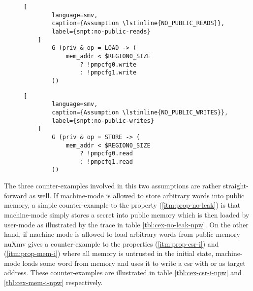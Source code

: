 \begin{figure}
    \begin{lstlisting}[
        language=smv,
        caption={Assumption \lstinline{NO_PUBLIC_READS}},
        label={snpt:no-public-reads}
    ]
        G (priv & op = LOAD -> (
            mem_addr < $REGION0_SIZE
                ? !pmpcfg0.write
                : !pmpcfg1.write
        ))
    \end{lstlisting}

    \begin{lstlisting}[
        language=smv,
        caption={Assumption \lstinline{NO_PUBLIC_WRITES}},
        label={snpt:no-public-writes}
    ]
        G (priv & op = STORE -> (
            mem_addr < $REGION0_SIZE
                ? !pmpcfg0.read
                : !pmpcfg1.read
        ))
    \end{lstlisting}
\end{figure}

The three counter-examples involved in this two assumptions are rather straight-forward as well.
If machine-mode is allowed to store arbitrary words into public memory, a simple counter-example to the  property (\ref{itm:prop-no-leak}) is that machine-mode simply stores a secret into public memory which is then loaded by user-mode as illustrated by the trace in table \ref{tbl:cex-no-leak-npw}.
On the other hand, if machine-mode is allowed to load arbitrary words from public memory nuXmv gives a counter-example to the properties  (\ref{itm:prop-csr-i}) and  (\ref{itm:prop-mem-i}) where all memory is untrusted in the initial state, machine-mode loads some word from memory and uses it to write a \gls{csr} with or as target address.
These counter-examples are illustrated in table \ref{tbl:cex-csr-i-npw} and \ref{tbl:cex-mem-i-npw} respectively.

\begin{table}
    \begin{subtable}{\textwidth}
        \centering
        
        \caption{ (\ref{itm:prop-no-leak})}
        \label{tbl:cex-no-leak-npw}
    \end{subtable}

    \begin{subtable}{\textwidth}
        \centering
        
        \caption{ (\ref{itm:prop-csr-i})}
        \label{tbl:cex-csr-i-npw}
    \end{subtable}

    \begin{subtable}{\textwidth}
        \centering
        
        \caption{ (\ref{itm:prop-mem-i})}
        \label{tbl:cex-mem-i-npw}
    \end{subtable}
    \caption{Counter-examples for  and }
\end{table}

